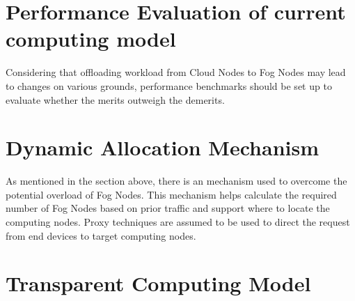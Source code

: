 \section{Performance Evaluation of current computing model}
Considering that offloading workload from Cloud Nodes to Fog Nodes may lead to changes on various grounds, performance benchmarks should be set up to evaluate whether the merits outweigh the demerits.

\section{Dynamic Allocation Mechanism}
As mentioned in the section above, there is an mechanism used to overcome the potential overload of Fog Nodes. This mechanism helps calculate the required number of Fog Nodes based on prior traffic and support where to locate the computing nodes. Proxy techniques are assumed to be used to direct the request from end devices to target computing nodes.

\section{Transparent Computing Model}